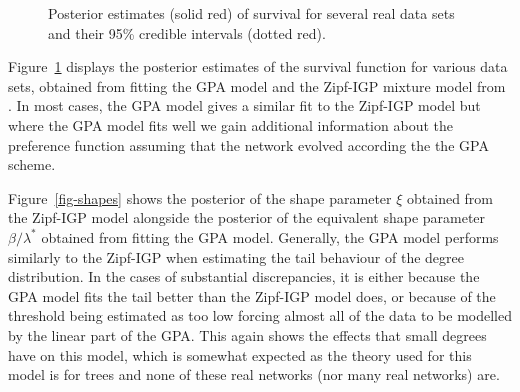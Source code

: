 \documentclass[
  sn-basic,
]{sn-jnl}
\theoremstyle{plain}
\theoremstyle{plain}
\theoremstyle{remark}
\begin{document}
\begin{figure}


\caption{\label{fig-real1}Posterior estimates (solid red) of survival
for several real data sets and their 95\% credible intervals (dotted
red).}

\end{figure}%

Figure~\ref{fig-real1} displays the posterior estimates of the survival
function for various data sets, obtained from fitting the GPA model and
the Zipf-IGP mixture model from \citet{Lee24}. In most cases, the GPA
model gives a similar fit to the Zipf-IGP model but where the GPA model
fits well we gain additional information about the preference function
assuming that the network evolved according the the GPA scheme.

Figure~\ref{fig-shapes} shows the posterior of the shape parameter
\(\xi\) obtained from the Zipf-IGP model alongside the posterior of the
equivalent shape parameter \(\beta/\lambda^*\) obtained from fitting the
GPA model. Generally, the GPA model performs similarly to the Zipf-IGP
when estimating the tail behaviour of the degree distribution. In the
cases of substantial discrepancies, it is either because the GPA model
fits the tail better than the Zipf-IGP model does, or because of the
threshold being estimated as too low forcing almost all of the data to
be modelled by the linear part of the GPA. This again shows the effects
that small degrees have on this model, which is somewhat expected as the
theory used for this model is for trees and none of these real networks
(nor many real networks) are.
\end{document}
